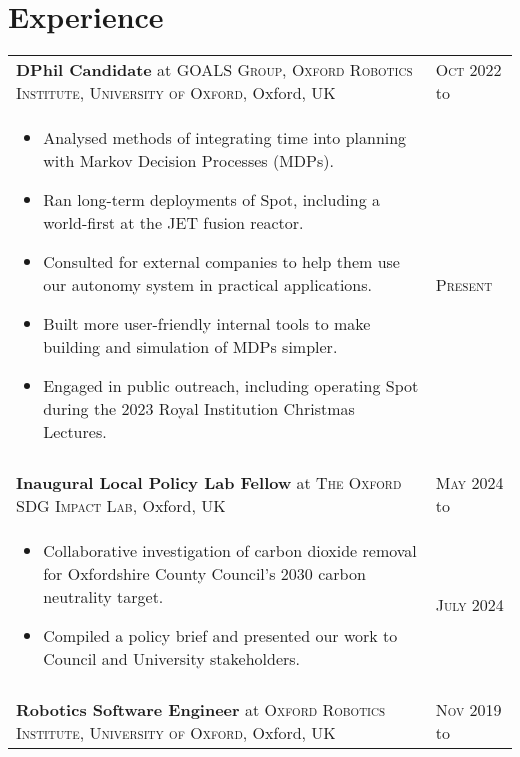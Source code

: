 \documentclass[a4paper,10pt]{article}
\newcommand{\datelen}{1.8cm}
\newcommand{\descrlen}{15.5cm}
\begin{document}
\section{Experience}
\begin{tabular}{p{\descrlen}|p{\datelen}}
  \textbf{DPhil Candidate} at \textsc{GOALS Group, Oxford Robotics Institute, University of Oxford}, Oxford, UK& \textsc{Oct 2022} to\\
  \small{
  \vspace{-0.4cm}
  \begin{itemize}
    \item Analysed methods of integrating time into planning with Markov Decision Processes (MDPs).
    \item Ran long-term deployments of Spot, including a world-first at the JET fusion reactor.
    \item Consulted for external companies to help them use our autonomy system in practical applications.
    \item Built more user-friendly internal tools to make building and simulation of MDPs simpler.
    \item Engaged in public outreach, including operating Spot during the 2023 Royal Institution Christmas Lectures.
    \vspace{-0.5cm}
  \end{itemize}
  }& \textsc{Present}
  \\
  \multicolumn{2}{c}{}\\[-0.2cm]
  \textbf{Inaugural Local Policy Lab Fellow} at \textsc{The Oxford SDG Impact Lab}, Oxford, UK& \textsc{May 2024} to\\
  \small{
  \vspace{-0.4cm}
  \begin{itemize}
  \item Collaborative investigation of carbon dioxide removal for Oxfordshire County Council's 2030 carbon neutrality target.
  \item Compiled a policy brief and presented our work to Council and University stakeholders.
    \vspace{-0.5cm}
  \end{itemize}
  }& \textsc{July 2024}
  \\
  \multicolumn{2}{c}{}\\[-0.2cm]
  \textbf{Robotics Software Engineer} at \textsc{Oxford Robotics Institute, University of Oxford}, Oxford, UK&\textsc{Nov 2019} to\\

\end{tabular}
\end{document}
